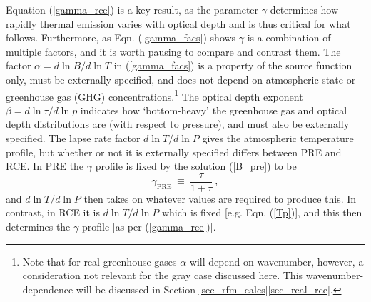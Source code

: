 \documentclass{ametsoc}
\newcommand{\beqn}{\begin{equation}}
\newcommand{\eeqn}{\end{equation}}
\newcommand{\n}{\nonumber}
\newcommand{\eqnref}[1]{(\ref{#1})}
\begin{document}
Equation \eqnref{gamma_rce} is a key result, as the parameter $\gamma$ determines how rapidly thermal emission varies with optical depth and is thus critical for what follows. Furthermore, as Eqn. \eqnref{gamma_facs} shows $\gamma$ is a combination of multiple factors, and it is worth pausing to compare and contrast them. The factor $\alpha = d \ln B/ d \ln T$ in \eqnref{gamma_facs}  is a property of the source function only, must be externally specified, and does not depend on atmospheric state or greenhouse gas (GHG) concentrations.\footnote{Note that for real greenhouse gases $\alpha$ will depend on wavenumber, however, a consideration not relevant for the gray case discussed here. This wavenumber-dependence will be discussed in Section \ref{sec_rfm_calcs}\ref{sec_real_rce}.} The optical depth exponent $\beta = d\ln \tau/d \ln p$ indicates how `bottom-heavy' the greenhouse gas and optical depth distributions are (with respect to pressure), and must also be externally specified.  The lapse rate factor $d \ln T/ d\ln P$ gives the atmospheric temperature profile, but whether or not it is externally specified differs between PRE and RCE. In PRE the $\gamma$ profile is fixed by the solution \eqnref{B_pre} to be 
\beqn
	\gamma_{\mathrm{PRE}} \  \equiv \ \frac{\tau}{1+\tau} \ ,
	\n
\eeqn
 and $d \ln T/ d\ln P$ then takes on whatever values are required to produce this. In contrast, in RCE it is $d \ln T/ d\ln P$ which is fixed [e.g. Eqn. \eqnref{Tp}], and this then determines the $\gamma$ profile [as per \eqnref{gamma_rce}].
\end{document}
